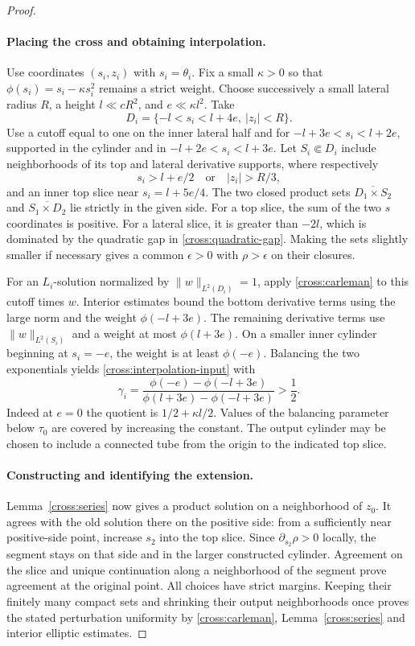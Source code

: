 \documentclass[11pt]{article}
\theoremstyle{definition}
\theoremstyle{remark}
\numberwithin{equation}{section}
\begin{document}
\begin{proof}
\paragraph{Placing the cross and obtaining interpolation.}
Use coordinates $(s_i,z_i)$ with $s_i=\theta_i$. Fix a small
$\kappa>0$ so that $\phi(s_i)=s_i-\kappa s_i^2$ remains a strict weight.
Choose successively a small lateral radius $R$, a height
$l\ll cR^2$, and $e\ll\kappa l^2$.  Take
\[
 D_i=\{-l<s_i<l+4e,\ |z_i|<R\}.
\]
Use a cutoff equal to one on the inner lateral half and for
$-l+3e<s_i<l+2e$, supported in the cylinder and in
$-l+2e<s_i<l+3e$.
Let $S_i\Subset D_i$ include neighborhoods of its top and lateral
derivative supports, where respectively
\[
 s_i>l+e/2\quad\text{or}\quad |z_i|>R/3,
\]
and an inner top slice near $s_i=l+5e/4$.
The two closed product sets $\overline{D_1\times S_2}$ and
$\overline{S_1\times D_2}$ lie strictly in the given side.
For a top slice, the sum of the two $s$ coordinates is positive.
For a lateral slice, it is greater than $-2l$, which is dominated
by the quadratic gap in \eqref{cross:quadratic-gap}.
Making the sets slightly smaller if necessary gives a common
$\epsilon>0$ with $\rho>\epsilon$ on their closures.

For an $L_i$-solution normalized by $\|w\|_{L^2(D_i)}=1$, apply
\eqref{cross:carleman} to this cutoff times $w$.  Interior estimates
bound the bottom derivative terms using the large norm and the weight
$\phi(-l+3e)$.  The remaining derivative terms use
$\|w\|_{L^2(S_i)}$ and a weight at most $\phi(l+3e)$.
On a smaller inner cylinder beginning at $s_i=-e$, the weight is at
least $\phi(-e)$.  Balancing the two exponentials yields
\eqref{cross:interpolation-input} with
\begin{equation}\label{cross:exponent}
 \gamma_i=
 \frac{\phi(-e)-\phi(-l+3e)}{
       \phi(l+3e)-\phi(-l+3e)}>\frac12.
\end{equation}
Indeed at $e=0$ the quotient is $1/2+\kappa l/2$.
Values of the balancing parameter below $\tau_0$ are covered by
increasing the constant.  The output cylinder may be chosen to include
a connected tube from the origin to the indicated top slice.

\paragraph{Constructing and identifying the extension.}
Lemma~\ref{cross:series} now gives a product solution on a neighborhood
of $z_0$. It agrees with the old solution there on the positive side:
from a sufficiently near positive-side point, increase $s_2$ into
the top slice.  Since $\partial_{s_2}\rho>0$ locally, the segment stays
on that side and in the larger constructed cylinder.  Agreement on
the slice and unique continuation along a neighborhood of the segment
prove agreement at the original point.
All choices have strict margins.  Keeping their finitely many compact
sets and shrinking their output neighborhoods once proves the stated
perturbation uniformity by \eqref{cross:carleman},
Lemma~\ref{cross:series} and interior elliptic estimates.
\end{proof}
\end{document}
